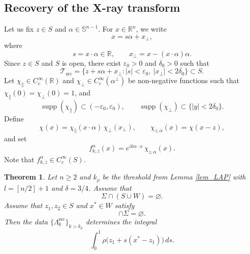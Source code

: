 \documentclass[12pt,a4paper]{amsart}
\numberwithin{equation}{section}
\theoremstyle{plain}
\newtheorem{theorem}{Theorem}[section]
\theoremstyle{definition}
\begin{document}
\subsection{Recovery of the X-ray transform}
Let us fix $z\in S$ and $\alpha \in \mathbb{S}^{n-1}$.
For $x\in \mathbb{R}^n$, we write
\begin{equation*}
    x = s\alpha + x_\perp,
\end{equation*}
where
\begin{equation*}
    s = x\cdot\alpha \in \mathbb{R},
    \qquad
    x_\perp = x-(x\cdot\alpha)\alpha.
\end{equation*}
Since $z\in S$ and $S$ is open, there exist
$\varepsilon_0>0$ and $\delta_0>0$ such that
\begin{equation}\label{def_tube}
    \mathcal{T}_{\mathrm{src}}
    = \{ z + s\alpha + x_\perp : |s| < \varepsilon_0,\ |x_\perp| < 2\delta_0 \}
    \subset S.
\end{equation}
Let $\chi_\parallel \in C_c^\infty(\mathbb{R})$ and $\chi_\perp \in C_c^\infty(\alpha^\perp)$ be non-negative functions such that $\chi_\parallel(0) = \chi_\perp(0) = 1$,  and
\begin{equation*}
    \operatorname{supp}(\chi_\parallel) \subset (-\varepsilon_0,\varepsilon_0),
    \qquad
    \operatorname{supp}(\chi_\perp) \subset \{ |y| < 2\delta_0 \}.
\end{equation*}
Define
\begin{equation}\label{def_chi}
    \chi(x)
    = \chi_\parallel(x\cdot\alpha)\,\chi_\perp(x_\perp),
    \qquad
    \chi_{z,\alpha}(x) = \chi(x - z),
\end{equation}
and set
\begin{equation}\label{def_source}
    f_{k,z}^\alpha(x) = e^{ik\alpha\cdot x}\, \chi_{z,\alpha}(x).
\end{equation}
Note that $f_{k,z}^\alpha \in C_c^\infty(S)$.
\begin{theorem}\label{thm:determination}
    Let $n \geq 2$ and $k_\rho$ be the threshold from Lemma \ref{lem_LAP} with $l=[n/2]+1$ and $\delta=3/4$. Assume that
    \begin{equation*}
        \Sigma \cap (S\cup W) = \varnothing.
    \end{equation*}
    Assume that $z_1, z_2\in S$ and $x^* \in W$ satisfy
    \begin{equation*}
        [z_2,x^*] \cap \Sigma = \varnothing.
    \end{equation*}
    Then the data $\{\Lambda_k^{\mathrm{src}}\}_{k>k_\rho}$ determines the integral
    \begin{equation*}
        \int_0^1 \rho\bigl(z_1 + s(x^* - z_1)\bigr)\,ds.
    \end{equation*}
\end{theorem}
\end{document}
